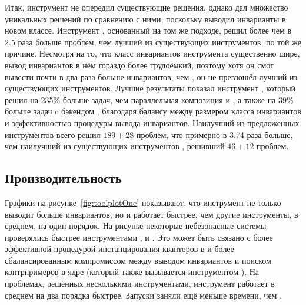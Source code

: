 Итак, инструмент \ringen{\cvc{}} не опередил существующие решения, однако дал множество уникальных решений по сравнению с ними, поскольку выводил инварианты в новом классе. Инструмент \ringen{\vampire{}}, основанный на том же подходе, решил более чем в 2.5 раза больше проблем, чем лучший из существующих инструментов, по той же причине. Несмотря на то, что класс инвариантов инструмента \ringenSync{} существенно шире, вывод инвариантов в нём гораздо более трудоёмкий, поэтому хотя он смог вывести почти в два раза больше инвариантов, чем \ringen{\cvc{}}, он не превзошёл лучший из существующих инструментов. Лучшие результаты показал инструмент \ringenCICI{\cvc{}}, который решил на 235\% больше задач, чем параллельная композиция \racer{} и \ringen{\cvc{}}, а также на 39\% больше задач c бэкендом \vampire{}, благодаря балансу между размером класса инвариантов и эффективностью процедуры вывода инвариантов. Наилучший из предложенных инструментов \ringenCICI{\vampire{}} всего решил $189+28$ проблем, что примерно в 3.74 раза больше, чем наилучший из существующих инструментов \eldarica{}, решивший $46+12$ проблем.

\subsection{Производительность}\label{sec:evaluation/performance}

\toolplotOne{}

Графики на рисунке~\ref{fig:toolplotOne} показывают, что инструмент \ringen{\cvc{}} не только выводит больше инвариантов, но и работает быстрее, чем другие инструменты, в среднем, на один порядок. На рисунке некоторые небезопасные системы проверялись быстрее инструментами \cvcind{}, \vericat{} и \racer{}. Это может быть связано с более эффективной процедурой инстанцирования кванторов в \cvcind{} и более сбалансированным компромиссом между выводом инвариантов и поиском контрпримеров в ядре \racer{} (который также вызывается инструментом \vericat{}).
На проблемах, решённых несколькими инструментами, инструмент \ringen{\cvc} работает в среднем на два порядка быстрее.
Запуски \ringen{\vampire{}} заняли ещё меньше времени, чем \ringen{\cvc}.

